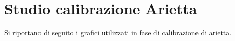 \section{Studio calibrazione Arietta}
Si riportano di seguito i grafici utilizzati in fase di calibrazione di arietta.
